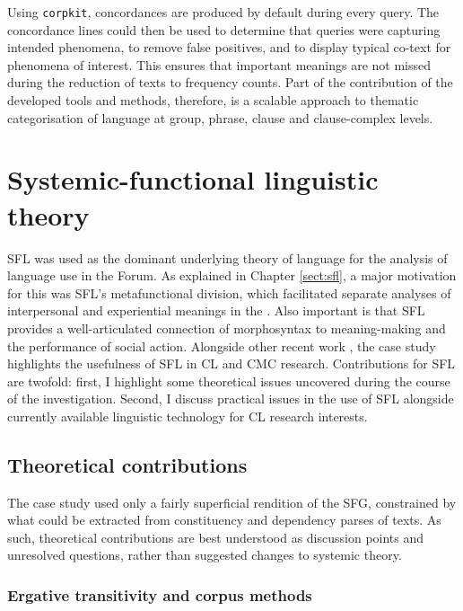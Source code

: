 Using \texttt{corpkit}, concordances are produced by default during every query. The concordance lines could then be used to determine that queries were capturing intended phenomena, to remove false positives, and to display typical co\hyp{}text for  phenomena of interest. This ensures that important meanings are not missed during the reduction of texts to frequency counts. Part of the contribution of the developed tools and methods, therefore, is a scalable approach to thematic categorisation of language at group, phrase, clause and clause\hyp{}complex levels.

\section{Systemic-functional linguistic theory}

\gls{SFL} was used as the dominant underlying theory of language for the analysis of language use in the \gls{Forum}. As explained in Chapter \ref{sect:sfl}, a major motivation for this was \gls{SFL}'s metafunctional division, which facilitated separate analyses of interpersonal and experiential meanings in the . Also important is that \gls{SFL} provides a well\hyp{}articulated connection of morphosyntax to meaning\hyp{}making and the performance of social action. Alongside other recent work \cite[e.g.][]{coffin_using_2013,hunston_systemic_2013}, the case study highlights the usefulness of \gls{SFL} in \gls{CL} and \gls{CMC} research. Contributions for \gls{SFL} are twofold: first, I highlight some theoretical issues uncovered during the course of the investigation. Second, I discuss practical issues in the use of \gls{SFL} alongside currently available linguistic technology for \gls{CL} research interests.

\subsection{Theoretical contributions}

The case study used only a fairly superficial rendition of the \gls{SFG}, constrained by what could be extracted from constituency and dependency parses of texts. As such, theoretical contributions are best understood as discussion points and unresolved questions, rather than suggested changes to systemic theory.

\subsubsection{Ergative transitivity and corpus methods}

